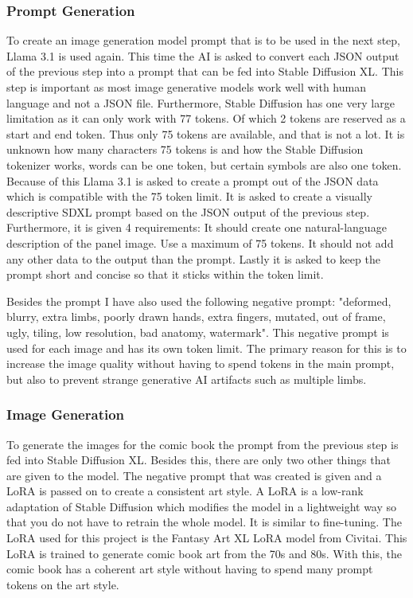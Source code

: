 \subsubsection*{Prompt Generation}
To create an image generation model prompt that is to be used in the next step, Llama 3.1 is used again. This time the AI is asked to convert each JSON output of the previous step into a prompt that can be fed into Stable Diffusion XL. This step is important as most image generative models work well with human language and not a JSON file. Furthermore, Stable Diffusion has one very large limitation as it can only work with 77 tokens. Of which 2 tokens are reserved as a start and end token. Thus only 75 tokens are available, and that is not a lot. It is unknown how many characters 75 tokens is and how the Stable Diffusion tokenizer works, words can be one token, but certain symbols are also one token. Because of this Llama 3.1 is asked to create a prompt out of the JSON data which is compatible with the 75 token limit. It is asked to create a visually descriptive SDXL prompt based on the JSON output of the previous step. Furthermore, it is given 4 requirements: It should create one natural-language description of the panel image. Use a maximum of 75 tokens. It should not add any other data to the output than the prompt. Lastly it is asked to keep the prompt short and concise so that it sticks within the token limit.

Besides the prompt I have also used the following negative prompt: "deformed, blurry, extra limbs, poorly drawn hands, extra fingers, mutated, out of frame, ugly, tiling, low resolution, bad anatomy, watermark". This negative prompt is used for each image and has its own token limit. The primary reason for this is to increase the image quality without having to spend tokens in the main prompt, but also to prevent strange generative AI artifacts such as multiple limbs.

\subsubsection*{Image Generation}
To generate the images for the comic book the prompt from the previous step is fed into Stable Diffusion XL. Besides this, there are only two other things that are given to the model. The negative prompt that was created is given and a LoRA is passed on to create a consistent art style. A LoRA is a low-rank adaptation of Stable Diffusion which modifies the model in a lightweight way so that you do not have to retrain the whole model. It is similar to fine-tuning. The LoRA used for this project is the Fantasy Art XL LoRA model from Civitai. This LoRA is trained to generate comic book art from the 70s and 80s. With this, the comic book has a coherent art style without having to spend many prompt tokens on the art style. 

